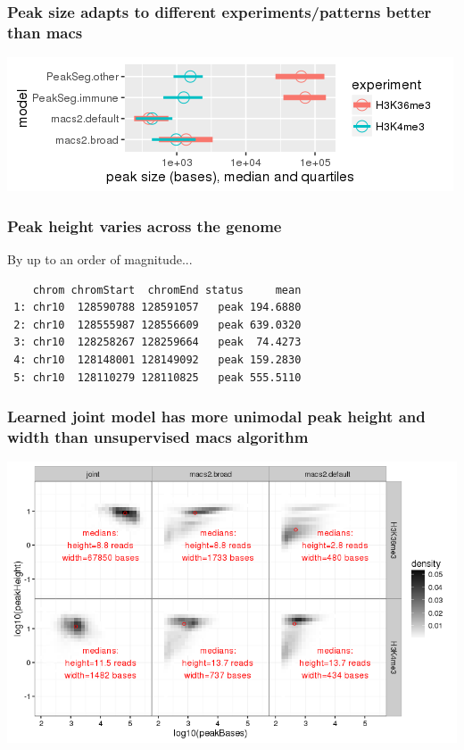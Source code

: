\documentclass{beamer}
\begin{document}
\begin{frame}
  \frametitle{Peak size adapts to different experiments/patterns
    better than macs}
  
  \includegraphics[width=\textwidth]{figure-PeakSeg-macs-peak-size-comparison}

\end{frame}

\begin{frame}[fragile]
  \frametitle{Peak height varies across the genome}

By up to an order of magnitude...
  
\begin{verbatim}
    chrom chromStart  chromEnd status     mean
 1: chr10  128590788 128591057   peak 194.6880
 2: chr10  128555987 128556609   peak 639.0320
 3: chr10  128258267 128259664   peak  74.4273
 4: chr10  128148001 128149092   peak 159.2830
 5: chr10  128110279 128110825   peak 555.5110
\end{verbatim}

\end{frame}

\begin{frame}
  \frametitle{Learned joint model has more unimodal peak height and
    width than unsupervised macs algorithm}
  
\includegraphics[width=\textwidth]{figure-compare-size-height.png}
\end{frame}
\end{document}
